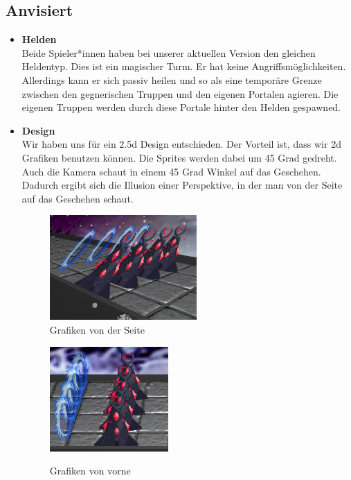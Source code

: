 \subsection{Anvisiert}
\begin{itemize}
    \item \textbf{Helden} \\
        Beide Spieler*innen haben bei unserer aktuellen Version den gleichen Heldentyp. Dies ist ein magischer Turm. Er hat keine Angriffsmöglichkeiten. Allerdings kann er sich passiv heilen und so als eine
        temporäre Grenze zwischen den gegnerischen Truppen und den eigenen Portalen agieren. Die eigenen Truppen werden durch diese Portale hinter den Helden gespawned.
    \item \textbf{Design} \\
        Wir haben uns für ein 2.5d Design entschieden. Der Vorteil ist, dass wir 2d Grafiken benutzen können. Die Sprites werden dabei um 45 Grad gedreht. Auch 
        die Kamera schaut in einem 45 Grad Winkel auf das Geschehen. Dadurch ergibt sich die Illusion einer Perspektive, in der man von der Seite auf das Geschehen schaut. 



        \begin{figure}[H]
            \centering
            \begin{minipage}[H]{7cm}
            \centering
            \includegraphics[height=4cm]{resources/25d.png}\\
            \caption{Grafiken von der Seite}
            \end{minipage}\hfill
            \begin{minipage}[H]{7cm}
            \centering
            \includegraphics[height=4cm]{resources/25dtwo.png}\\
            \caption{Grafiken von vorne}
            \end{minipage}
        \end{figure}
        

\end{itemize}
